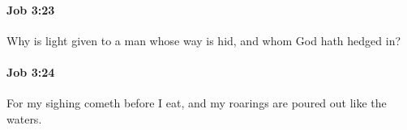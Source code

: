 		\paragraph{Job 3:23} %
			\label{JOB-3-23}

			Why is light given to a man whose way is hid, and whom God hath hedged in?


		\paragraph{Job 3:24} %
			\label{JOB-3-24}

			For my sighing cometh before I eat, and my roarings are poured out like the waters.


